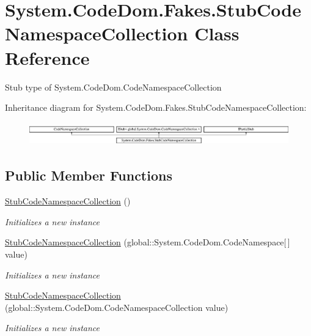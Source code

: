 \hypertarget{class_system_1_1_code_dom_1_1_fakes_1_1_stub_code_namespace_collection}{\section{System.\-Code\-Dom.\-Fakes.\-Stub\-Code\-Namespace\-Collection Class Reference}
\label{class_system_1_1_code_dom_1_1_fakes_1_1_stub_code_namespace_collection}
}


Stub type of System.\-Code\-Dom.\-Code\-Namespace\-Collection 


Inheritance diagram for System.\-Code\-Dom.\-Fakes.\-Stub\-Code\-Namespace\-Collection\-:\begin{figure}[H]
\begin{center}
\leavevmode
\includegraphics[height=1.022831cm]{class_system_1_1_code_dom_1_1_fakes_1_1_stub_code_namespace_collection}
\end{center}
\end{figure}
\subsection*{Public Member Functions}
\begin{DoxyCompactItemize}
\item 
\hyperlink{class_system_1_1_code_dom_1_1_fakes_1_1_stub_code_namespace_collection_adb6d9cc7542b8183cd565e5624a79c62}{Stub\-Code\-Namespace\-Collection} ()
\begin{DoxyCompactList}\small\item\em Initializes a new instance\end{DoxyCompactList}\item 
\hyperlink{class_system_1_1_code_dom_1_1_fakes_1_1_stub_code_namespace_collection_a21ad6fd840a9eb8e531cfb142ccdd2ff}{Stub\-Code\-Namespace\-Collection} (global\-::\-System.\-Code\-Dom.\-Code\-Namespace\mbox{[}$\,$\mbox{]} value)
\begin{DoxyCompactList}\small\item\em Initializes a new instance\end{DoxyCompactList}\item 
\hyperlink{class_system_1_1_code_dom_1_1_fakes_1_1_stub_code_namespace_collection_aa24375d593e11b40ae2e3fe4686e7e0a}{Stub\-Code\-Namespace\-Collection} (global\-::\-System.\-Code\-Dom.\-Code\-Namespace\-Collection value)
\begin{DoxyCompactList}\small\item\em Initializes a new instance\end{DoxyCompactList}\end{DoxyCompactItemize}
